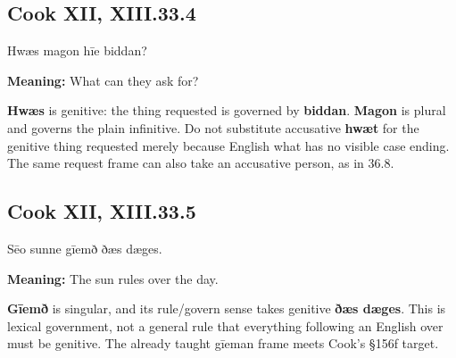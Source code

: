 \par\begin{minipage}{\linewidth}\raggedright
\subsection*{Cook XII, XIII.33.4}

Hwæs magon hīe biddan?

\textbf{Meaning:} What can they ask for?

\textbf{Hwæs} is genitive: the thing requested is governed by \textbf{biddan}. \textbf{Magon} is plural and governs the plain infinitive. Do not substitute accusative \textbf{hwæt} for the genitive thing requested merely because English what has no visible case ending. The same request frame can also take an accusative person, as in 36.8.

\end{minipage}\par\addvspace{4pt}

\par\begin{minipage}{\linewidth}\raggedright
\subsection*{Cook XII, XIII.33.5}

Sēo sunne gīemð ðæs dæges.

\textbf{Meaning:} The sun rules over the day.

\textbf{Gīemð} is singular, and its rule/\allowbreak{}govern sense takes genitive \textbf{ðæs dæges}. This is lexical government, not a general rule that everything following an English over must be genitive. The already taught gīeman frame meets Cook’s §156f target.

\end{minipage}\par\addvspace{4pt}

